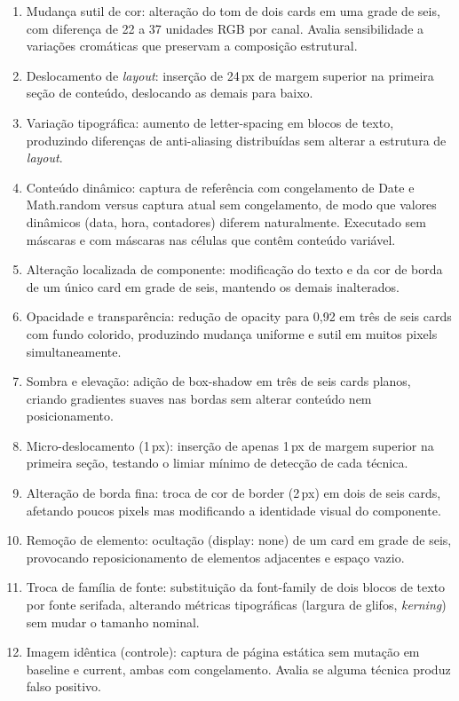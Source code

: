 \documentclass{UNESC}
\begin{document}
\begin{enumerate}[label=\alph*),leftmargin=1.5em]
  \item Mudança sutil de cor: alteração do tom de dois cards em uma grade de seis, com diferença de 22 a 37 unidades RGB por canal. Avalia sensibilidade a variações cromáticas que preservam a composição estrutural.
  \item Deslocamento de \emph{layout}: inserção de 24\,px de margem superior na primeira seção de conteúdo, deslocando as demais para baixo.
  \item Variação tipográfica: aumento de letter-spacing em blocos de texto, produzindo diferenças de anti-aliasing distribuídas sem alterar a estrutura de \emph{layout}.
  \item Conteúdo dinâmico: captura de referência com congelamento de Date e Math.random versus captura atual sem congelamento, de modo que valores dinâmicos (data, hora, contadores) diferem naturalmente. Executado sem máscaras e com máscaras nas células que contêm conteúdo variável.
  \item Alteração localizada de componente: modificação do texto e da cor de borda de um único card em grade de seis, mantendo os demais inalterados.
  \item Opacidade e transparência: redução de opacity para 0,92 em três de seis cards com fundo colorido, produzindo mudança uniforme e sutil em muitos pixels simultaneamente.
  \item Sombra e elevação: adição de box-shadow em três de seis cards planos, criando gradientes suaves nas bordas sem alterar conteúdo nem posicionamento.
  \item Micro-deslocamento (1\,px): inserção de apenas 1\,px de margem superior na primeira seção, testando o limiar mínimo de detecção de cada técnica.
  \item Alteração de borda fina: troca de cor de border (2\,px) em dois de seis cards, afetando poucos pixels mas modificando a identidade visual do componente.
  \item Remoção de elemento: ocultação (display: none) de um card em grade de seis, provocando reposicionamento de elementos adjacentes e espaço vazio.
  \item Troca de família de fonte: substituição da font-family de dois blocos de texto por fonte serifada, alterando métricas tipográficas (largura de glifos, \emph{kerning}) sem mudar o tamanho nominal.
  \item Imagem idêntica (controle): captura de página estática sem mutação em baseline e current, ambas com congelamento. Avalia se alguma técnica produz falso positivo.
\end{enumerate}
\end{document}
